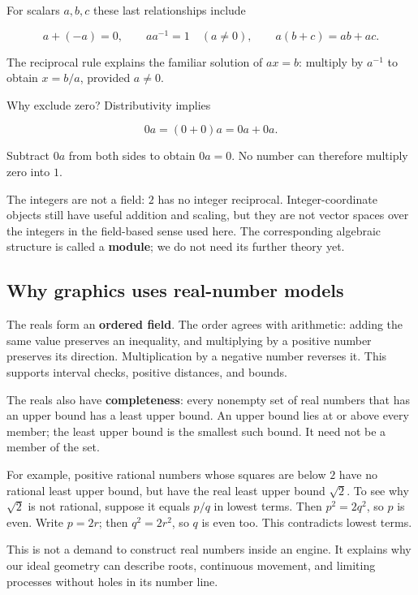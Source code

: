 For scalars \(a,b,c\) these last relationships include

\[
a+(-a)=0,\qquad aa^{-1}=1\quad(a\ne0),\qquad a(b+c)=ab+ac.
\]

The reciprocal rule explains the familiar solution of \(ax=b\): multiply by \(a^{-1}\) to obtain \(x=b/a\), provided \(a\ne0\).

Why exclude zero? Distributivity implies

\[
0a=(0+0)a=0a+0a.
\]

Subtract \(0a\) from both sides to obtain \(0a=0\). No number can therefore multiply zero into \(1\).

The integers are not a field: \(2\) has no integer reciprocal. Integer-coordinate objects still have useful addition and scaling, but they are not vector spaces over the integers in the field-based sense used here. The corresponding algebraic structure is called a \textbf{module}; we do not need its further theory yet.

\subsection{Why graphics uses real-number models}\label{01-foundations-i-ch017-why-graphics-uses-real-number-models}

The reals form an \textbf{ordered field}. The order agrees with arithmetic: adding the same value preserves an inequality, and multiplying by a positive number preserves its direction. Multiplication by a negative number reverses it. This supports interval checks, positive distances, and bounds.

The reals also have \textbf{completeness}: every nonempty set of real numbers that has an upper bound has a least upper bound. An upper bound lies at or above every member; the least upper bound is the smallest such bound. It need not be a member of the set.

For example, positive rational numbers whose squares are below \(2\) have no rational least upper bound, but have the real least upper bound \(\sqrt2\). To see why \(\sqrt2\) is not rational, suppose it equals \(p/q\) in lowest terms. Then \(p^2=2q^2\), so \(p\) is even. Write \(p=2r\); then \(q^2=2r^2\), so \(q\) is even too. This contradicts lowest terms.

This is not a demand to construct real numbers inside an engine. It explains why our ideal geometry can describe roots, continuous movement, and limiting processes without holes in its number line.

